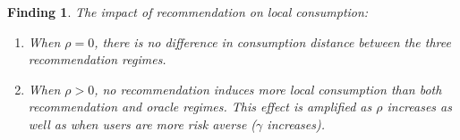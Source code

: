 \documentclass[manuscript, nonacm]{acmart}
\newtheorem{finding}{Finding}
\begin{document}
\begin{finding}\label{finding_local_consumption}
The impact of recommendation on local consumption:
\begin{enumerate}
\item When $\rho = 0$, there is no difference in consumption distance between the three recommendation regimes.
\item When $\rho > 0$, no recommendation induces more local consumption than both recommendation and oracle regimes. This effect is amplified as $\rho$ increases as well as when users are more risk averse ($\gamma$ increases).
\end{enumerate}
\end{finding}
\end{document}
